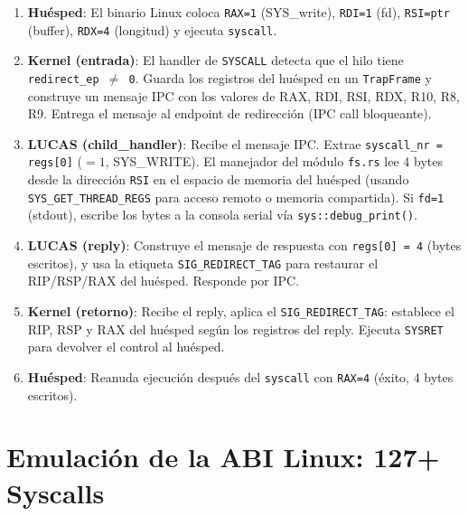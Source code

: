 \documentclass[11pt,twoside,openright]{book}
\theoremstyle{definition}
\theoremstyle{plain}
\theoremstyle{remark}
\begin{document}
\begin{enumerate}
    \item \textbf{Huésped}: El binario Linux coloca \texttt{RAX=1} (SYS\_write),
          \texttt{RDI=1} (fd), \texttt{RSI=ptr} (buffer), \texttt{RDX=4} (longitud)
          y ejecuta \texttt{syscall}.

    \item \textbf{Kernel (entrada)}: El handler de \texttt{SYSCALL} detecta que el
          hilo tiene \texttt{redirect\_ep $\neq$ 0}. Guarda los registros del huésped
          en un \texttt{TrapFrame} y construye un mensaje IPC con los valores de
          RAX, RDI, RSI, RDX, R10, R8, R9. Entrega el mensaje al endpoint de
          redirección (IPC call bloqueante).

    \item \textbf{LUCAS (child\_handler)}: Recibe el mensaje IPC. Extrae
          \texttt{syscall\_nr = regs[0]} ($= 1$, SYS\_WRITE). El manejador del módulo
          \texttt{fs.rs} lee 4 bytes desde la dirección \texttt{RSI} en el espacio de
          memoria del huésped (usando \texttt{SYS\_GET\_THREAD\_REGS} para acceso remoto
          o memoria compartida). Si \texttt{fd=1} (stdout), escribe los bytes a la
          consola serial vía \texttt{sys::debug\_print()}.

    \item \textbf{LUCAS (reply)}: Construye el mensaje de respuesta con
          \texttt{regs[0] = 4} (bytes escritos), y usa la etiqueta
          \texttt{SIG\_REDIRECT\_TAG} para restaurar el RIP/RSP/RAX del huésped.
          Responde por IPC.

    \item \textbf{Kernel (retorno)}: Recibe el reply, aplica el
          \texttt{SIG\_REDIRECT\_TAG}: establece el RIP, RSP y RAX del huésped
          según los registros del reply. Ejecuta \texttt{SYSRET} para devolver
          el control al huésped.

    \item \textbf{Huésped}: Reanuda ejecución después del \texttt{syscall} con
          \texttt{RAX=4} (éxito, 4 bytes escritos).
\end{enumerate}

\section{Emulación de la ABI Linux: 127+ Syscalls}
\label{sec:lucas-abi}
\end{document}
